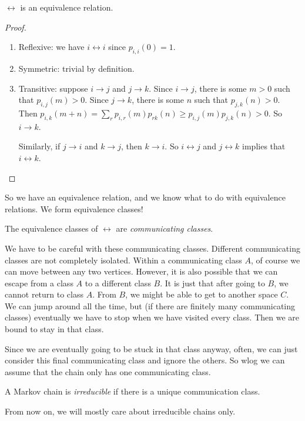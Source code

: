 \documentclass[a4paper]{article}
\begin{document}
\begin{prop}
  $\leftrightarrow$ is an equivalence relation.
\end{prop}

\begin{proof}\leavevmode
  \begin{enumerate}
    \item Reflexive: we have $i \leftrightarrow i$ since $p_{i, i}(0) = 1$.
    \item Symmetric: trivial by definition.
    \item Transitive: suppose $i \to j$ and $j \to k$. Since $i \to j$, there is some $m > 0$ such that $p_{i, j}(m) > 0$. Since $j \to k$, there is some $n$ such that $p_{j, k}(n) > 0$. Then $p_{i, k}(m + n) = \sum_{r} p_{i, r}(m)p_{r k}(n) \geq p_{i, j}(m)p_{j, k}(n) > 0$. So $i \to k$.

      Similarly, if $j \to i$ and $k \to j$, then $k \to i$. So $i \leftrightarrow j$ and $j \leftrightarrow k$ implies that $i \leftrightarrow k$.\qedhere
  \end{enumerate}
\end{proof}
So we have an equivalence relation, and we know what to do with equivalence relations. We form equivalence classes!
\begin{defi}
  The equivalence classes of $\leftrightarrow$ are \emph{communicating classes}.
\end{defi}
We have to be careful with these communicating classes. Different communicating classes are not completely isolated. Within a communicating class $A$, of course we can move between any two vertices. However, it is also possible that we can escape from a class $A$ to a different class $B$. It is just that after going to $B$, we cannot return to class $A$. From $B$, we might be able to get to another space $C$. We can jump around all the time, but (if there are finitely many communicating classes) eventually we have to stop when we have visited every class. Then we are bound to stay in that class.

Since we are eventually going to be stuck in that class anyway, often, we can just consider this final communicating class and ignore the others. So wlog we can assume that the chain only has one communicating class.

\begin{defi}
  A Markov chain is \emph{irreducible} if there is a unique communication class.
\end{defi}
From now on, we will mostly care about irreducible chains only.
\end{document}
